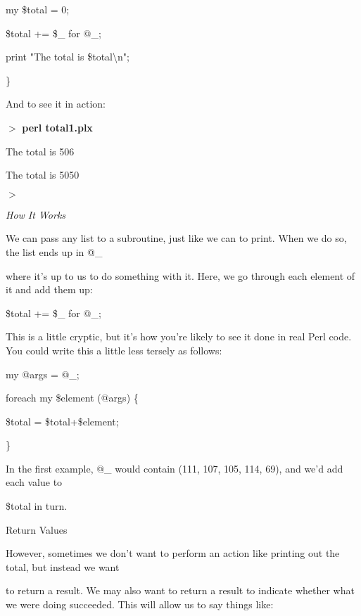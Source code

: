 \documentclass[a4paper,11pt]{book}
\begin{document}
\noindent my \$total = 0;

\noindent \$total += \$\_  for @\_;

\noindent print "The total is \$total\textbackslash n";

\noindent \}

\noindent 

\noindent 

\noindent And to see it in action:

\noindent 

\noindent $>$ \textbf{perl total1.plx}

\noindent The total is 506

\noindent The total is 5050

\noindent $>$

\noindent 

\noindent \textit{How It Works}

\noindent We can pass any list to a subroutine, just like we can to print. When we do so, the list ends up in @\_

\noindent where it's up to us to do something with it. Here, we go through each element of it and add them up:

\noindent 

\noindent \$total += \$\_  for @\_;

\noindent 

\noindent This is a little cryptic, but it's how you're likely to see it done in real Perl code. You could write this a little less tersely as follows:

\noindent 

\noindent my @args = @\_;

\noindent foreach my \$element (@args) \{

\noindent \$total = \$total+\$element;

\noindent \}

\noindent 

\noindent In the first example, @\_ would contain (111, 107, 105, 114, 69), and we'd add each value to

\noindent \$total in turn.

\noindent 

\noindent Return Values

\noindent 

\noindent However, sometimes we don't want to perform an action like printing out the total, but instead we want

\noindent to return a result. We may also want to return a result to indicate whether what we were doing succeeded. This will allow us to say things like:
\end{document}
